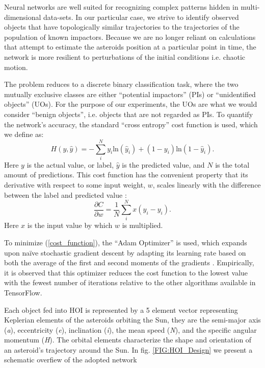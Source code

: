 \documentclass{aa}
\begin{document}
Neural networks are well suited for recognizing complex patterns
hidden in multi-dimensional data-sets. In our particular case, we
strive to identify observed objects that have topologically similar
trajectories to the trajectories of the population of known
impactors. Because we are no longer reliant on calculations that
attempt to estimate the asteroids position at a particular point in
time, the network is more resilient to perturbations of the initial
conditions i.e. chaotic motion.

The problem reduces to a discrete binary classification task, where
the two mutually exclusive classes are either ``potential impactors''
(PIs) or ``unidentified objects'' (UOs). For the purpose of our
experiments, the UOs are what we would consider ``benign objects'',
i.e. objects that are not regarded as PIs. To quantify the network's
accuracy, the standard ``cross entropy'' cost function is used, which
we define as:
\begin{equation}
	\label{cost_function}
	H(y,\hat{y})=-\sum_i^{N} y_i \text{ln}(\hat{y}_i)+(1-y_i)\text{ln}(1-\hat{y}_i).
\end{equation}
Here $y$ is the actual value, or label, $\hat{y}$ is the predicted
value, and $N$ is the total amount of predictions. This cost function
has the convenient property that its derivative with respect to some
input weight, $w$, scales linearly with the difference between the
label and predicted value \citep{Nielson}:
\begin{equation}
	\frac{\partial C}{\partial w}=\frac{1}{N}\sum^{N}_i x(\hat{y}_i-y_i).
\end{equation}
Here $x$ is the input value by which $w$ is multiplied.

To minimize (\ref{cost_function}), the ``Adam Optimizer'' is used,
which expands upon na\"{i}ve stochastic gradient descent by adapting
its learning rate based on both the average of the first and second
moments of the gradients \citep{AdamOptimizer}. Empirically, it is
observed that this optimizer reduces the cost function to the lowest
value with the fewest number of iterations relative to the other
algorithms available in TensorFlow.

Each object fed into HOI is represented by a 5 element vector
representing Keplerian elements of the asteroids orbiting the Sun,
they are the semi-major axis (\textit{a}), eccentricity (\textit{e}),
inclination (\textit{i}), the mean speed (\textit{N}), and the
specific angular momentum (\textit{H}).  The orbital elements
characterize the shape and orientation of an asteroid's trajectory
around the Sun.  In fig.  \ref{FIG:HOI_Design} we present a schematic
overfiew of the adopted network
\end{document}
